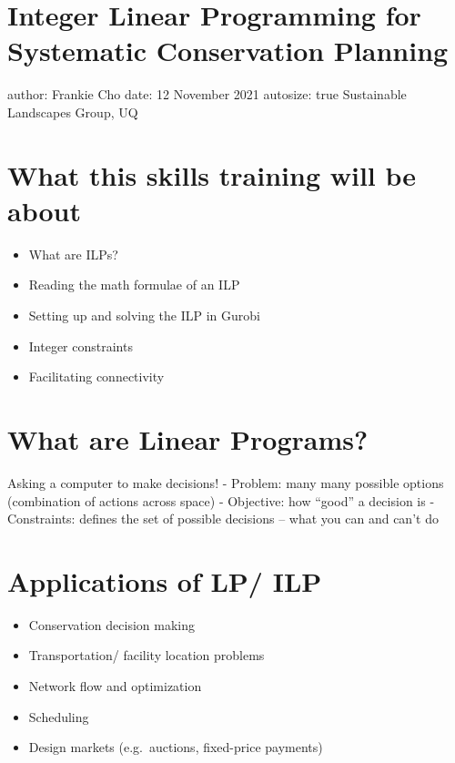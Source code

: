 \documentclass[
]{article}
\author{}
\date{\vspace{-2.5em}}
\providecommand{\tightlist}{%
  \setlength{\itemsep}{0pt}\setlength{\parskip}{0pt}}
\begin{document}
\hypertarget{integer-linear-programming-for-systematic-conservation-planning}{%
\section{Integer Linear Programming for Systematic Conservation
Planning}\label{integer-linear-programming-for-systematic-conservation-planning}}

author: Frankie Cho date: 12 November 2021 autosize: true Sustainable
Landscapes Group, UQ

\hypertarget{what-this-skills-training-will-be-about}{%
\section{What this skills training will be
about}\label{what-this-skills-training-will-be-about}}

\begin{itemize}
\tightlist
\item
  What are ILPs?
\item
  Reading the math formulae of an ILP
\item
  Setting up and solving the ILP in Gurobi
\item
  Integer constraints
\item
  Facilitating connectivity
\end{itemize}

\hypertarget{what-are-linear-programs}{%
\section{What are Linear Programs?}\label{what-are-linear-programs}}

Asking a computer to make decisions! - Problem: many many possible
options (combination of actions across space) - Objective: how ``good''
a decision is - Constraints: defines the set of possible decisions --
what you can and can't do

\hypertarget{applications-of-lp-ilp}{%
\section{Applications of LP/ ILP}\label{applications-of-lp-ilp}}

\begin{itemize}
\tightlist
\item
  Conservation decision making
\item
  Transportation/ facility location problems
\item
  Network flow and optimization
\item
  Scheduling
\item
  Design markets (e.g.~auctions, fixed-price payments)
\end{itemize}
\end{document}
